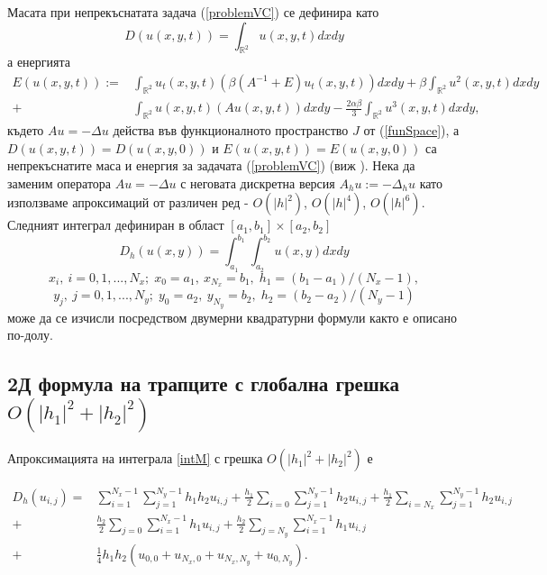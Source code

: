 \documentclass{article}
\newcommand{\rf}[1]{(\ref{#1})}
\newcommand{\RR}{\mathbb{R}}
\begin{document}
Масата при непрекъснатата задача \rf{problemVC} се дефинира като
\begin{equation}\label{intM}
D(u(x,y,t))=\int_{\RR^2} u(x,y,t)dx dy
\end{equation}
а енергията 
\begin{align}\label{ex-en}
E(u(x,y,t)):=&\int_{\RR^2} u_t(x,y,t) \left(\beta(A^{-1}+E)u_t(x,y,t)\right) dxdy+
\beta \int_{\RR^2} u^2(x,y,t) dxdy \nonumber\\
+& \int_{\RR^2}u(x,y,t) \left(A u(x,y,t)\right) dxdy
-\frac{2 \alpha \beta}{3} \int_{\RR^2} u^3(x,y,t) dxdy,
\end{align}
където $Au=-\Delta u$ действа във функционалното пространство $J$ от \rf{funSpace}, а $D(u(x,y,t)) = D(u(x,y,0))$ и $E(u(x,y,t)) = E(u(x,y,0))$ са непрекъснатите маса и енергия за задачата \rf{problemVC} (виж \cite{ref1}). Нека да заменим оператора $Au=-\Delta u$ с неговата дискретна версия $A_hu :=-\Delta_h u$ като използваме апроксимаций от различен ред - $O(|h|^2)$, $O(|h|^4)$, $O(|h|^6)$.
Следният интеграл дефиниран в област $[a_1, b_1] \times [a_2, b_2]$
\begin{equation}\label{int}
D_h(u(x,y))=\int_{a_1}^{b_1} \int_{a_2}^{b_2} u(x,y)dx dy
\end{equation}
$$x_i, ~i=0,1,...,N_x; \;x_0=a_1,~x_{N_x}=b_1, \;h_1=(b_1-a_1)/(N_x-1),$$
$$y_j, ~j=0,1,...,N_y; \; y_0=a_2,~y_{N_y}=b_2, \;h_2=(b_2-a_2)/(N_y-1)$$
може да се изчисли посредством двумерни квадратурни формули както е описано по-долу.

\subsection{ 2Д формула на трапците с глобална грешка $O(|h_1|^2+|h_2|^2)$ }

Апроксимацията на интеграла \eqref{intM} с грешка $O(|h_1|^2+|h_2|^2)$ е

\begin{align}\label{quadr2}
D_h(u_{i,j}) =& \sum_{i=1}^{N_x-1} \sum_{j=1}^{N_y-1} h_1 h_2 u_{i,j}
+\frac{h_1}{2}\sum_{i=0} \sum_{j=1}^{N_y-1} h_2 u_{i,j}
+\frac{h_1}{2}\sum_{i=N_x} \sum_{j=1}^{N_y-1} h_2 u_{i,j} \nonumber\\
+&\frac{h_2}{2}\sum_{j=0} \sum_{i=1}^{N_x-1} h_1 u_{i,j}
+\frac{h_2}{2}\sum_{j=N_y} \sum_{i=1}^{N_x-1} h_1 u_{i,j}
\nonumber\\
+&\frac{1}{4}h_1 h_2 \left(u_{0,0}+u_{N_x,0}+u_{N_x,N_y}+u_{0,N_y}
\right).
\end{align}
\end{document}

